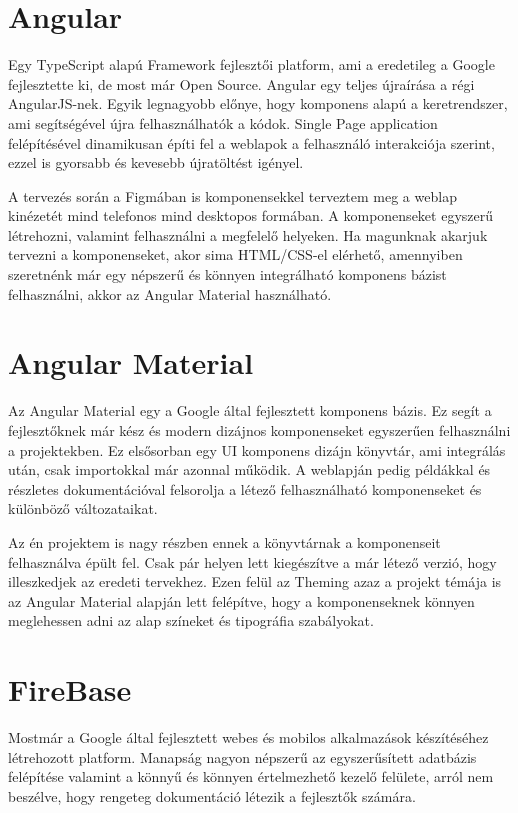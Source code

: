 \documentclass[12pt]{report}
\theoremstyle{definition}
\begin{document}
\section{Angular}
Egy TypeScript alapú Framework fejlesztői platform, ami a eredetileg a Google fejlesztette ki, de most már Open Source. Angular egy teljes újraírása a régi AngularJS-nek. Egyik legnagyobb előnye, hogy komponens alapú a keretrendszer, ami segítségével újra felhasználhatók a kódok. Single Page application felépítésével dinamikusan építi fel a weblapok a felhasználó interakciója szerint, ezzel is gyorsabb és kevesebb újratöltést igényel.

A tervezés során a Figmában is komponensekkel terveztem meg a weblap kinézetét mind telefonos mind desktopos formában. A komponenseket egyszerű létrehozni, valamint felhasználni a megfelelő helyeken. Ha magunknak akarjuk tervezni a komponenseket, akor sima HTML/CSS-el elérhető, amennyiben szeretnénk már egy népszerű és könnyen integrálható komponens bázist felhasználni, akkor az Angular Material használható.

\section{Angular Material}
Az Angular Material egy a Google által fejlesztett komponens bázis. Ez segít a fejlesztőknek már kész és modern dizájnos komponenseket egyszerűen felhasználni a projektekben. Ez elsősorban egy UI komponens dizájn könyvtár, ami integrálás után, csak importokkal már azonnal működik. A weblapján pedig példákkal és részletes dokumentációval felsorolja a létező felhasználható komponenseket és különböző változataikat.

Az én projektem is nagy részben ennek a könyvtárnak a komponenseit felhasználva épült fel. Csak pár helyen lett kiegészítve a már létező verzió, hogy illeszkedjek az eredeti tervekhez. Ezen felül az Theming azaz a projekt témája is az Angular Material alapján lett felépítve, hogy a komponenseknek könnyen meglehessen adni az alap színeket és tipográfia szabályokat.

\section{FireBase}
Mostmár a Google által fejlesztett webes és mobilos alkalmazások készítéséhez létrehozott platform. Manapság nagyon népszerű az egyszerűsített adatbázis felépítése valamint a könnyű és könnyen értelmezhető kezelő felülete, arról nem beszélve, hogy rengeteg dokumentáció létezik a fejlesztők számára.
\end{document}
